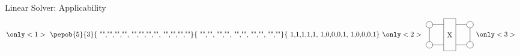 \begin{frame}{Linear Solver: Applicability}
    \begin{equation}
        \only<1>{  \vcenter{\hbox{ \pepob{5}{3}{{
                                "","","","",
                                "","","","",
                                "","","",""}}{{
                                "","",
                                "","",
                                "","",
                                "","",
                                "",""}}{{
                                1,1,1,1,1,
                                1,0,0,0,1,
                                1,0,0,0,1}} } }}
        \only<2>{        \vcenter{\hbox{  \begin{tikzpicture}[baseline=0.5]

                        \def \legLength { 0.8}
                        \def \radius {0.1}

                        \pgfmathsetmacro{\step}{2*\radius+ \legLength} %
                        \pgfmathsetmacro{\legpos}{\radius+\legLength} %

                        \node[draw, circle,radius=\radius] (L0) at (-1,0) {};
                        \node[draw, circle,radius=\radius] (L1) at (-1,1) {};

                        \draw (-0.3,1.3) -- (0.3,1.3) -- (0.3,-0.3) -- (-0.3,-0.3) -- cycle;

                        \node[draw, circle,radius=\radius] (R0) at (1,0) {};
                        \node[draw, circle,radius=\radius] (R1) at (1,1) {};

                        \draw (L0) --   (L1);
                        \draw (R0) --   (R1);

                        \draw (L0) --   (-0.3,0);
                        \draw (L1) --   (-0.3,1);

                        \draw (R0) --   (0.3,0);
                        \draw (R1) --   (0.3,1);

                        \node[draw=none] (C0) at (0,0.5) {X};
                    \end{tikzpicture} }} }
        \only<3>{  \vcenter{\hbox{  \begin{tikzpicture}[baseline=0.5]

                        \def \legLength { 0.8}
                        \def \radius {0.1}

                        \pgfmathsetmacro{\step}{2*\radius+ \legLength} %
                        \pgfmathsetmacro{\legpos}{\radius+\legLength} %


\end{tikzpicture}}}}
\end{equation}
\end{frame}
